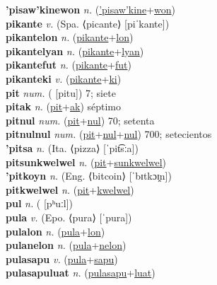 \textbf{'pisaw'kinewon} \textit{n.} (\hyperref['pisaw'kine]{'pisaw'kine}+\hyperref[won]{won})
 \label{'pisaw'kinewon} \\
\textbf{pikante} \textit{v.} (Spa. ⟨picante⟩ [piˈkante])
 \label{pikante} \\
\textbf{pikantelon} \textit{n.} (\hyperref[pikante]{pikante}+\hyperref[lon]{lon})
 \label{pikantelon} \\
\textbf{pikantelyan} \textit{n.} (\hyperref[pikante]{pikante}+\hyperref[lyan]{lyan})
 \label{pikantelyan} \\
\textbf{pikantefut} \textit{n.} (\hyperref[pikante]{pikante}+\hyperref[fut]{fut})
 \label{pikantefut} \\
\textbf{pikanteki} \textit{v.} (\hyperref[pikante]{pikante}+\hyperref[ki]{ki})
 \label{pikanteki} \\
\textbf{pit} \textit{num.} ( [pitu])
7; siete \label{pit} \\
\textbf{pitak} \textit{n.} (\hyperref[pit]{pit}+\hyperref[ak]{ak})
séptimo \label{pitak} \\
\textbf{pitnul} \textit{num.} (\hyperref[pit]{pit}+\hyperref[nul]{nul})
70; setenta \label{pitnul} \\
\textbf{pitnulnul} \textit{num.} (\hyperref[pit]{pit}+\hyperref[nul]{nul}+\hyperref[nul]{nul})
700; setecientos \label{pitnulnul} \\
\textbf{'pitsa} \textit{n.} (Ita. ⟨pizza⟩ [ˈpit͡sːa])
 \label{'pitsa} \\
\textbf{pitsunkwelwel} \textit{n.} (\hyperref[pit]{pit}+\hyperref[sunkwelwel]{sunkwelwel})
 \label{pitsunkwelwel} \\
\textbf{'pitkoyn} \textit{n.} (Eng. ⟨bitcoin⟩ [ˈbɪtkɔɪ̯n])
 \label{'pitkoyn} \\
\textbf{pitkwelwel} \textit{n.} (\hyperref[pit]{pit}+\hyperref[kwelwel]{kwelwel})
 \label{pitkwelwel} \\
\textbf{pul} \textit{n.} ( [pʰuːl])
 \label{pul} \\
\textbf{pula} \textit{v.} (Epo. ⟨pura⟩ [ˈpura])
 \label{pula} \\
\textbf{pulalon} \textit{n.} (\hyperref[pula]{pula}+\hyperref[lon]{lon})
 \label{pulalon} \\
\textbf{pulanelon} \textit{n.} (\hyperref[pula]{pula}+\hyperref[nelon]{nelon})
 \label{pulanelon} \\
\textbf{pulasapu} \textit{v.} (\hyperref[pula]{pula}+\hyperref[sapu]{sapu})
 \label{pulasapu} \\
\textbf{pulasapuluat} \textit{n.} (\hyperref[pulasapu]{pulasapu}+\hyperref[luat]{luat})
